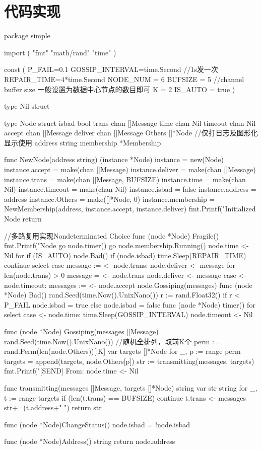 \chapter{代码实现}\label{app:code}
\begin{codeblock}[language=GO]
    package simple

import (
	"fmt"
	"math/rand"
	"time"
)

const (
	P_FAIL=0.1
	GOSSIP_INTERVAL=time.Second //1s发一次
	REPAIR_TIME=4*time.Second
	NODE_NUM = 6
	BUFSIZE = 5 //channel buffer size 一般设置为数据中心节点的数目即可
	K = 2
	IS_AUTO = true
)

type Nil struct {}

type Node struct {
	isbad bool
	trans chan []Message
	time chan Nil
	timeout chan Nil
	accept chan []Message
	deliver chan []Message
	Others []*Node
	//仅打日志及图形化显示使用
	address string
	membership *Membership
}

func NewNode(address string) (instance *Node) {
	instance = new(Node)
	instance.accept = make(chan []Message)
	instance.deliver = make(chan []Message)
	instance.trans = make(chan []Message, BUFSIZE)
	instance.time = make(chan Nil)
	instance.timeout = make(chan Nil)
	instance.isbad = false
	instance.address = address
	instance.Others = make([]*Node, 0)
	instance.membership = NewMembership(address, instance.accept, instance.deliver)
	fmt.Printf("Initialized Node %
	return
}

//多路复用实现Nondeterminated Choice
func (node *Node) Fragile() {
	fmt.Printf("Node %
	go node.timer()
	go node.membership.Running()
	node.time <- Nil{}
	for {
		if (IS_AUTO) {
			node.Bad()
		}
		if (node.isbad) {
			time.Sleep(REPAIR_TIME)
			continue
		}
		select {
		case message := <- node.trans:
			node.deliver <- message
			for len(node.trans) > 0 {
				message = <- node.trans
				node.deliver <- message
			}
		case <- node.timeout:
			messages := <- node.accept
			node.Gossiping(messages)
		}
	}
}
func (node *Node) Bad() {
	rand.Seed(time.Now().UnixNano())
		r := rand.Float32()
		if r < P_FAIL {
			node.isbad = true
		} else {
			node.isbad = false
		}
}
func (node *Node) timer() {
	for {
		select {
		case <- node.time:
			time.Sleep(GOSSIP_INTERVAL)
			node.timeout <- Nil{}
		}
	}
}

func (node *Node) Gossiping(messages []Message) {
	rand.Seed(time.Now().UnixNano())
	//随机全排列，取前K个
	perm := rand.Perm(len(node.Others))[:K]
	var targets []*Node
	for _, p := range perm {
		targets = append(targets, node.Others[p])
	}
	str := transmitting(messages, targets)
	fmt.Printf("[SEND] From: %
	node.time <- Nil{}
}

func transmitting(messages []Message, targets []*Node) string {
	var str string
	for _, t := range targets {
		if (len(t.trans) == BUFSIZE) {
			continue
		}
		t.trans <- messages
		str+=(t.address+" ")
	}
	return str
}

func (node *Node)ChangeStatus() {
	node.isbad = !node.isbad
}

func (node *Node)Address() string {
	return node.address
}
\end{codeblock}

